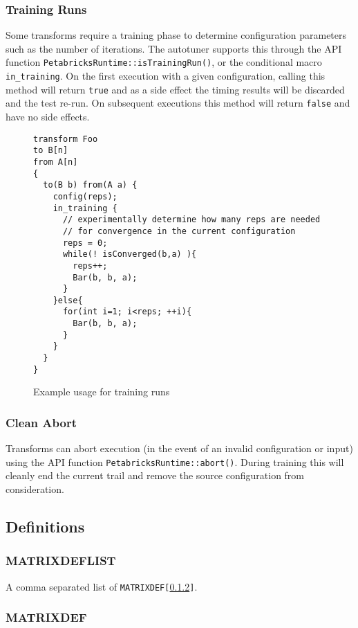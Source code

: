 \documentclass[11pt]{article}
\begin{document}
\subsubsection{Training Runs}


Some transforms require a training phase to determine configuration parameters
such as the number of iterations.  The autotuner supports this through the
API function {\tt PetabricksRuntime::isTrainingRun()}, or the conditional macro
{\tt in\_training}.  On the first execution with a given configuration,
calling this method will return {\tt true} and as a side effect the timing
results will be discarded and the test re-run.  On subsequent executions
this method will return {\tt false} and have no side effects.

\begin{figure}[h]
\begin{lstlisting}
transform Foo
to B[n]
from A[n]
{
  to(B b) from(A a) {
    config(reps);
    in_training {
      // experimentally determine how many reps are needed
      // for convergence in the current configuration
      reps = 0;
      while(! isConverged(b,a) ){
        reps++;
        Bar(b, b, a);
      }
    }else{
      for(int i=1; i<reps; ++i){
        Bar(b, b, a);
      }
    }
  }
}
\end{lstlisting}
\caption{
Example usage for training runs
\label{ex6}
}
\end{figure}

\subsubsection{Clean Abort}

Transforms can abort execution (in the event of an invalid configuration or
input) using the API function {\tt PetabricksRuntime::abort()}.  During training
this will cleanly end the current trail and remove the source configuration
from consideration.

\subsection{Definitions}
\subsubsection{MATRIXDEFLIST}
\label{MATRIXDEFLIST}
 
A comma separated list of {\tt MATRIXDEF[\ref{MATRIXDEF}]}.

\subsubsection{MATRIXDEF}
\label{MATRIXDEF}
\end{document}
